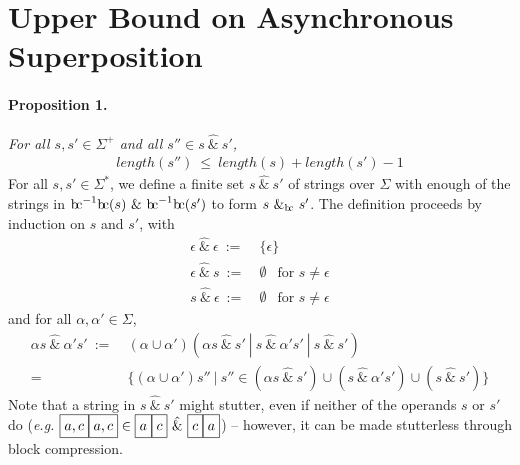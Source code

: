 \documentclass[a4paper,11pt]{article}
\newcommand{\bc}{{\rm b\!c}}
\newcommand{\vph}[1]{\vphantom{#1}}
\begin{document}
\section{Upper Bound on Asynchronous Superposition}
\paragraph{Proposition 1.} {\sl For all  $s, s' \in \Sigma^+$
and all $s''\in s\ \hat{\&}\ s'$,}
\begin{align*}
length(s'')\ \leq\ length(s) + length(s') -1
\end{align*}
\noindent
For all $s,s'\in \Sigma^{\ast}$, we define a finite set
$s~\hat{\&}~s'$ of strings over $\Sigma$ with enough of 
the strings in $\bc^{-1}\bc(s)~\&~\bc^{-1}\bc(s')$
to form $s~\&_{\bc}~s'$.
The definition proceeds by induction on $s$ and $s'$, with
\begin{align*}
\epsilon\ \hat{\&}\ \epsilon \ :=& \ \{\epsilon\}\\
\epsilon\ \hat{\&}\ s \ :=& \ \emptyset\ \ \mbox{ for } s\neq\epsilon\\
s\ \hat{\&}\ \epsilon \ :=& \ \emptyset\ \ \mbox{ for } s\neq\epsilon
\end{align*}
and for all $\alpha,\alpha'\in \Sigma$,
\begin{align*}
\alpha s~\hat{\&}~\alpha's' \ :=& \ 
(\alpha\cup \alpha')(\alpha s\ \hat{\&}\ s'
\ | \ s~\hat{\&}~\alpha's' \ | \  s~\hat{\&}~s')\\
=&~\{(\alpha\cup\alpha')s''\ | \ s''\in (\alpha s~\hat{\&}~s') \cup 
(s~\hat{\&}~\alpha's') \cup (s~\hat{\&}~s')\}
\end{align*}
Note that a string in $s\ \hat{\&}\ s'$ might stutter, even if neither of the 
operands $s$ or $s'$ do
(\textit{e.g.} $\fbox{$a,c\vph{,'}$}\fbox{$a,c\vph{,'}$}\in
\fbox{$a\vph{,'}$}\fbox{$c\vph{,'}$}\ \hat{\&}\ 
\fbox{$c\vph{,'}$}\fbox{$a\vph{,'}$}$)
-- however, it can be made stutterless through block compression.
\end{document}
